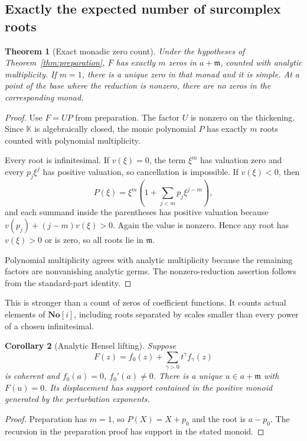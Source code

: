 \documentclass[11pt,a4paper]{article}
\numberwithin{equation}{section}
\newtheorem{theorem}{Theorem}[section]
\newtheorem{corollary}[theorem]{Corollary}
\theoremstyle{definition}
\theoremstyle{remark}
\newcommand{\No}{\mathbf{No}}
\newcommand{\K}{\mathbb K}
\newcommand{\mm}{\mathfrak m}
\begin{document}
\subsection{Exactly the expected number of surcomplex roots}
\begin{theorem}[Exact monadic zero count]
\label{thm:clusters}
Under the hypotheses of Theorem~\ref{thm:preparation}, $F$ has exactly $m$ zeros in $a+\mm$, counted with analytic multiplicity. If $m=1$, there is a unique zero in that monad and it is simple. At a point of the base where the reduction is nonzero, there are no zeros in the corresponding monad.
\end{theorem}
\begin{proof}
Use $F=UP$ from preparation. The factor $U$ is nonzero on the thickening. Since $\K$ is algebraically closed, the monic polynomial $P$ has exactly $m$ roots counted with polynomial multiplicity.

Every root is infinitesimal. If $v(\xi)=0$, the term $\xi^m$ has valuation zero and every $p_j\xi^j$ has positive valuation, so cancellation is impossible. If $v(\xi)<0$, then
\[
 P(\xi)=\xi^m\left(1+\sum_{j<m}p_j\xi^{j-m}\right),
\]
and each summand inside the parentheses has positive valuation because
$v(p_j)+(j-m)v(\xi)>0$. Again the value is nonzero. Hence any root has $v(\xi)>0$ or is zero, so all roots lie in $\mm$.

Polynomial multiplicity agrees with analytic multiplicity because the remaining factors are nonvanishing analytic germs. The nonzero-reduction assertion follows from the standard-part identity.
\end{proof}
This is stronger than a count of zeros of coefficient functions. It counts actual elements of $\No[i]$, including roots separated by scales smaller than every power of a chosen infinitesimal.

\begin{corollary}[Analytic Hensel lifting]
Suppose
\[
 F(z)=f_0(z)+\sum_{\gamma>0}t^\gamma f_\gamma(z)
\]
is coherent and $f_0(a)=0$, $f_0'(a)\ne0$. There is a unique $u\in a+\mm$ with $F(u)=0$. Its displacement has support contained in the positive monoid generated by the perturbation exponents.
\end{corollary}
\begin{proof}
Preparation has $m=1$, so $P(X)=X+p_0$ and the root is $a-p_0$. The recursion in the preparation proof has support in the stated monoid.
\end{proof}
\end{document}
